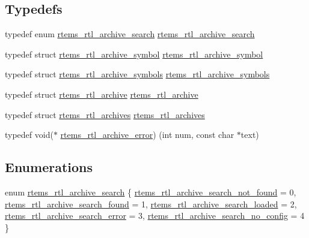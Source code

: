 \subsection*{Typedefs}
\begin{DoxyCompactItemize}
\item 
typedef enum \mbox{\hyperlink{rtl-archive_8h_a82930c14e64f3f5853052e84af4a6c2e}{rtems\+\_\+rtl\+\_\+archive\+\_\+search}} \mbox{\hyperlink{rtl-archive_8h_a7082b0ca172f429650fea8685f9de13e}{rtems\+\_\+rtl\+\_\+archive\+\_\+search}}
\item 
typedef struct \mbox{\hyperlink{structrtems__rtl__archive__symbol}{rtems\+\_\+rtl\+\_\+archive\+\_\+symbol}} \mbox{\hyperlink{rtl-archive_8h_a69d21ffb4c0f3127b437d52c875367df}{rtems\+\_\+rtl\+\_\+archive\+\_\+symbol}}
\item 
typedef struct \mbox{\hyperlink{structrtems__rtl__archive__symbols}{rtems\+\_\+rtl\+\_\+archive\+\_\+symbols}} \mbox{\hyperlink{rtl-archive_8h_ad022b9e84a86a706474c33ea6220b0b4}{rtems\+\_\+rtl\+\_\+archive\+\_\+symbols}}
\item 
typedef struct \mbox{\hyperlink{structrtems__rtl__archive}{rtems\+\_\+rtl\+\_\+archive}} \mbox{\hyperlink{rtl-archive_8h_a28e9348cd8916386c709e7cfa2523410}{rtems\+\_\+rtl\+\_\+archive}}
\item 
typedef struct \mbox{\hyperlink{structrtems__rtl__archives}{rtems\+\_\+rtl\+\_\+archives}} \mbox{\hyperlink{rtl-archive_8h_a1ed360f6d4f5a5b50228f5e899b9af77}{rtems\+\_\+rtl\+\_\+archives}}
\item 
typedef void($\ast$ \mbox{\hyperlink{rtl-archive_8h_aeb92821ca23c9daa5393579aa7b9212f}{rtems\+\_\+rtl\+\_\+archive\+\_\+error}}) (int num, const char $\ast$text)
\end{DoxyCompactItemize}
\subsection*{Enumerations}
\begin{DoxyCompactItemize}
\item 
enum \mbox{\hyperlink{rtl-archive_8h_a82930c14e64f3f5853052e84af4a6c2e}{rtems\+\_\+rtl\+\_\+archive\+\_\+search}} \{ \newline
\mbox{\hyperlink{rtl-archive_8h_a82930c14e64f3f5853052e84af4a6c2ea8a48e443b039535ffacf245974bce7b0}{rtems\+\_\+rtl\+\_\+archive\+\_\+search\+\_\+not\+\_\+found}} = 0, 
\mbox{\hyperlink{rtl-archive_8h_a82930c14e64f3f5853052e84af4a6c2ea786e49af33c7ab7a1655c34b16cda214}{rtems\+\_\+rtl\+\_\+archive\+\_\+search\+\_\+found}} = 1, 
\mbox{\hyperlink{rtl-archive_8h_a82930c14e64f3f5853052e84af4a6c2eabea397c7ded334c79f549d645426afcc}{rtems\+\_\+rtl\+\_\+archive\+\_\+search\+\_\+loaded}} = 2, 
\mbox{\hyperlink{rtl-archive_8h_a82930c14e64f3f5853052e84af4a6c2eabb8146313b58141dfa133188bda16a06}{rtems\+\_\+rtl\+\_\+archive\+\_\+search\+\_\+error}} = 3, 
\newline
\mbox{\hyperlink{rtl-archive_8h_a82930c14e64f3f5853052e84af4a6c2eab5896674df6ee65d59f5f521b1bbc9d9}{rtems\+\_\+rtl\+\_\+archive\+\_\+search\+\_\+no\+\_\+config}} = 4
 \}
\end{DoxyCompactItemize}
